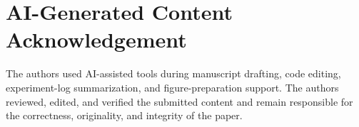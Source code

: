 \documentclass[conference]{IEEEtran}
\begin{document}
\section*{AI-Generated Content Acknowledgement}

The authors used AI-assisted tools during manuscript drafting, code editing, experiment-log summarization, and figure-preparation support. The authors reviewed, edited, and verified the submitted content and remain responsible for the correctness, originality, and integrity of the paper.



\end{document}
